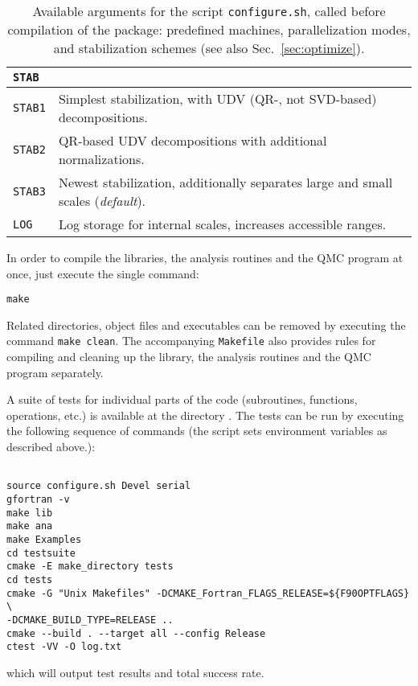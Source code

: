 \begin{table}[h]
\begin{center}
\begin{tabular}{@{} l l @{}}
			\textbf{\texttt{STAB}} &  \\\midrule
			\texttt{STAB1}  &  Simplest stabilization, with UDV (QR-, not SVD-based) decompositions.\\
			\texttt{STAB2}  &  QR-based UDV decompositions with additional normalizations.\\
			\texttt{STAB3}  &  Newest stabilization, additionally separates large and small scales (\emph{default}).\\
			\texttt{LOG}  &  Log storage for internal scales, increases accessible ranges.\\\bottomrule
		\end{tabular}
		\caption{Available arguments for the script \texttt{configure.sh}, called before compilation of the package: predefined machines, parallelization modes, and stabilization schemes (see also Sec.~\ref{sec:optimize}).} \label{table:configureHPC}
	\end{center}
\end{table}

In order to compile the libraries, the analysis routines and the QMC program at once, just execute the single command:%
\begin{lstlisting}[style=bash,morekeywords={make}]
make
\end{lstlisting}
Related directories, object files and executables can be removed by executing the command \lstinline[style=bash,morekeywords={make}]{make clean}. The accompanying \texttt{Makefile} also provides rules for compiling and cleaning up the library, the analysis routines and the QMC program separately.  

A suite of tests for individual parts of the code (subroutines, functions, operations, etc.) is available at the directory . The tests can be run by executing the following sequence of commands (the script  sets environment variables as described above.):
\begin{lstlisting}[style=bash,morekeywords={make,cmake,ctest}]

source configure.sh Devel serial
gfortran -v
make lib
make ana
make Examples
cd testsuite
cmake -E make_directory tests
cd tests
cmake -G "Unix Makefiles" -DCMAKE_Fortran_FLAGS_RELEASE=${F90OPTFLAGS} \
-DCMAKE_BUILD_TYPE=RELEASE ..
cmake --build . --target all --config Release
ctest -VV -O log.txt
\end{lstlisting}
which will output test results and total success rate.

